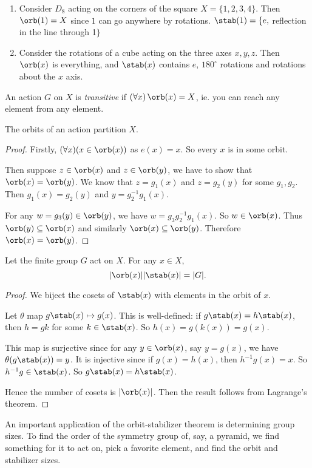 \documentclass[a4paper]{article}
\begin{document}
\begin{eg}\leavevmode
  \begin{enumerate}
    \item Consider $D_8$ acting on the corners of the square $X = \{1, 2, 3, 4\}$. Then $\orb(1) = X$ since $1$ can go anywhere by rotations. $\stab(1) = \{e, $ reflection in the line through 1$\}$
    \item Consider the rotations of a cube acting on the three axes $x, y, z$. Then $\orb(x)$ is everything, and $\stab(x)$ contains $e$, $180^\circ$ rotations and rotations about the $x$ axis.
  \end{enumerate}
\end{eg}

\begin{defi}
  An action $G$ on $X$ is \emph{transitive} if $(\forall x)\,\orb(x) = X$, ie. you can reach any element from any element.
\end{defi}

\begin{lemma}
  The orbits of an action partition $X$.
\end{lemma}

\begin{proof}
  Firstly, $(\forall x)(x\in \orb (x))$ as $e(x) = x$. So every $x$ is in some orbit.

  Then suppose $z\in \orb (x)$ and $z\in \orb (y)$, we have to show that $\orb(x) = \orb (y)$. We know that $z = g_1(x)$ and $z = g_2(y)$ for some $g_1, g_2$. Then $g_1(x) = g_2(y)$ and $y = g_2^{-1}g_1(x)$.

  For any $w = g_3(y)\in \orb (y)$, we have $w = g_3g_2^{-1}g_1(x)$. So $w\in \orb (x)$. Thus $\orb (y) \subseteq \orb (x)$ and similarly $\orb (x) \subseteq \orb (y)$. Therefore $\orb (x) = \orb (y)$.
\end{proof}

\begin{thm}
  Let the finite group $G$ act on $X$. For any $x\in X$,
  \[
    |\orb(x)||\stab(x)| = |G|.
  \]
\end{thm}

\begin{proof}
  We biject the cosets of $\stab(x)$ with elements in the orbit of $x$.

  Let $\theta$ map $g\stab(x) \mapsto g(x)$. This is well-defined: if $g\stab(x) = h\stab(x)$, then $h = gk$ for some $k\in \stab(x)$. So $h(x) = g(k(x)) = g(x)$.

  This map is surjective since for any $y\in \orb(x)$, say $y = g(x)$, we have $\theta(g\stab (x)) = y$. It is injective since if $g(x) = h(x)$, then $h^{-1}g(x) = x$. So $h^{-1}g\in \stab (x)$. So $g\stab(x) = h\stab(x)$.

  Hence the number of cosets is $|\orb(x)|$. Then the result follows from Lagrange's theorem.
\end{proof}
An important application of the orbit-stabilizer theorem is determining group sizes. To find the order of the symmetry group of, say, a pyramid, we find something for it to act on, pick a favorite element, and find the orbit and stabilizer sizes.
\end{document}
